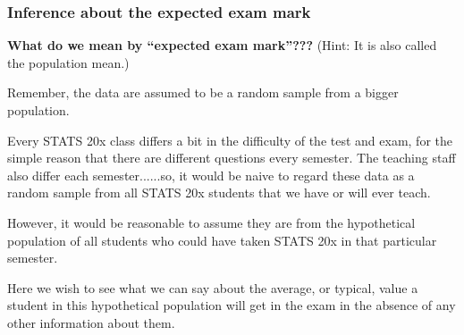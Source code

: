 \documentclass{beamer}\usepackage[]{graphicx}\usepackage[]{xcolor}
\makeatletter
\def\maxwidth{ %
  \ifdim\Gin@nat@width>\linewidth
    \linewidth
  \else
    \Gin@nat@width
  \fi
}
\newcommand{\hlnum}[1]{\textcolor[rgb]{0.686,0.059,0.569}{#1}}%
\newcommand{\hlstr}[1]{\textcolor[rgb]{0.192,0.494,0.8}{#1}}%
\newcommand{\hlcom}[1]{\textcolor[rgb]{0.678,0.584,0.686}{\textit{#1}}}%
\newcommand{\hlopt}[1]{\textcolor[rgb]{0,0,0}{#1}}%
\newcommand{\hlstd}[1]{\textcolor[rgb]{0.345,0.345,0.345}{#1}}%
\newcommand{\hlkwb}[1]{\textcolor[rgb]{0.69,0.353,0.396}{#1}}%
\newcommand{\hlkwc}[1]{\textcolor[rgb]{0.333,0.667,0.333}{#1}}%
\newcommand{\hlkwd}[1]{\textcolor[rgb]{0.737,0.353,0.396}{\textbf{#1}}}%
\newenvironment{kframe}{%
 \def\at@end@of@kframe{}%
 \ifinner\ifhmode%
  \def\at@end@of@kframe{\end{minipage}}%
  \begin{minipage}{\columnwidth}%
 \fi\fi%
 \def\FrameCommand##1{\hskip\@totalleftmargin \hskip-\fboxsep
 \colorbox{shadecolor}{##1}\hskip-\fboxsep
     \hskip-\linewidth \hskip-\@totalleftmargin \hskip\columnwidth}%
 \MakeFramed {\advance\hsize-\width
   \@totalleftmargin\z@ \linewidth\hsize
   \@setminipage}}%
 {\par\unskip\endMakeFramed%
 \at@end@of@kframe}
\newenvironment{knitrout}{}{} %
\makeatother
\begin{document}
\begin{frame}
\frametitle{Inference about the expected exam mark}
{\large\bf What do we mean by ``expected exam mark''???}
(Hint: It is also called the population mean.)

Remember, the data are assumed to be a random sample from a bigger population. 

Every STATS 20x class differs a bit in the difficulty of the test and exam, for the simple reason that there are different questions every semester. The teaching staff also differ each semester......so, it would be naive to regard these data as a random sample from all STATS 20x students that we have or will ever teach.

However, it would be reasonable to assume they are from the hypothetical population of all students who could have taken STATS 20x in that particular semester.

Here we wish to see what we can say about the average, or typical, value a student in this hypothetical population will get in the exam in the absence of any other information about them. 

\end{frame}


\end{document}
